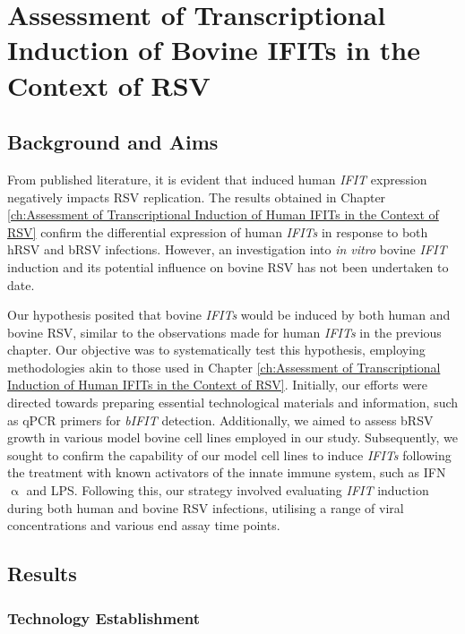 \chapter{Assessment of Transcriptional Induction of Bovine IFITs in the Context of RSV} \label{ch:Assessment of Transcriptional Induction of Bovine IFITs in the Context of RSV}
\section{Background and Aims} \label{sec:Background and Aims Chapter2}
From published literature, it is evident that induced human \textit{IFIT} expression negatively impacts RSV replication. The results obtained in Chapter \ref{ch:Assessment of Transcriptional Induction of Human IFITs in the Context of RSV} confirm the differential expression of human \textit{IFITs} in response to both hRSV and bRSV infections. However, an investigation into \textit{in vitro} bovine \textit{IFIT} induction and its potential influence on bovine RSV has not been undertaken to date.

Our hypothesis posited that bovine \textit{IFITs} would be induced by both human and bovine RSV, similar to the observations made for human \textit{IFITs} in the previous chapter. Our objective was to systematically test this hypothesis, employing methodologies akin to those used in Chapter \ref{ch:Assessment of Transcriptional Induction of Human IFITs in the Context of RSV}. Initially, our efforts were directed towards preparing essential technological materials and information, such as qPCR primers for \textit{bIFIT} detection. Additionally, we aimed to assess bRSV growth in various model bovine cell lines employed in our study. Subsequently, we sought to confirm the capability of our model cell lines to induce \textit{IFITs} following the treatment with known activators of the innate immune system, such as IFN$\upalpha$ and LPS. Following this, our strategy involved evaluating \textit{IFIT} induction during both human and bovine RSV infections, utilising a range of viral concentrations and various end assay time points.

\section{Results} \label{sec:Results Chapter2}
\subsection{Technology Establishment} \label{subsec:Technology Establishment}
